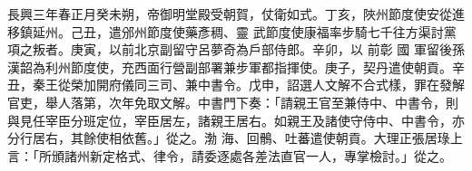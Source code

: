 
\begin{pinyinscope}

 長興三年春正月癸未朔，帝御明堂殿受朝賀，仗衛如式。丁亥，陜州節度使安從進移鎮延州。己丑，遣邠州節度使藥彥稠、靈
 武節度使康福率步騎七千往方渠討黨項之叛者。庚寅，以前北京副留守呂夢奇為戶部侍郎。辛卯，以
 前彰
 國
 軍留後孫漢韶為利州節度使，充西面行營副部署兼步軍都指揮使。庚子，契丹遣使朝貢。辛丑，秦王從榮加開府儀同三司、兼中書令。戊申，詔選人文解不合式樣，罪在發解官吏，舉人落第，次年免取文解。中書門下奏：「請親王官至兼侍中、中書令，則與見任宰臣分班定位，宰臣居左，諸親王居右。如親王及諸使守侍中、中書令，亦分行居右，其餘使相依舊。」從之。渤
 海、回鶻、吐蕃遣使朝貢。大理正張居琭上言：「所頒諸州新定格式、律令，請委逐處各差法直官一人，專掌檢討。」從之。




\end{pinyinscope}
